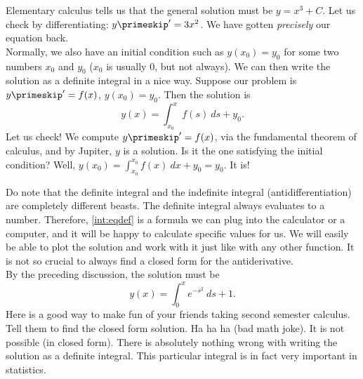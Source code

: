 {Elementary calculus tells us
that the general solution must be $y = x^3 + C$.  Let us check by
differentiating:
$y\primeskip ' = 3x^2$.  We have gotten \emph{precisely} our equation back.
}\\

Normally, we also have an initial condition such as $y(x_0) = y_0$
for some two numbers $x_0$ and $y_0$ ($x_0$ is usually 0, but not always).
We can then write the solution as a definite integral in a nice way.
Suppose our problem is $y\primeskip ' = f(x)$, $y(x_0) = y_0$.  Then the solution is
\begin{equation} \label{int:eqdef}
y(x) = \int_{x_0}^x f(s) ~ds + y_0 .
\end{equation}
Let us check!
We compute
$y\primeskip ' = f(x)$, via the fundamental theorem of calculus, and by Jupiter, $y$ is a
solution.  Is it the one satisfying the initial condition?  Well,
$y(x_0) = \int_{x_0}^{x_0} f(x)~dx + y_0 = y_0$.  It is!

Do note that the definite integral and the indefinite integral
(antidifferentiation) are completely different beasts.  The definite integral
always evaluates to a number.  Therefore, \eqref{int:eqdef} is a formula we
can plug into the calculator or a computer, and it will be happy to calculate
specific values for us.  We will easily be able to plot the
solution and work with it just like with any other function.
It is not so crucial to always find a
closed form for the antiderivative.\\

{By the preceding discussion, the solution must be
\begin{equation*}
y(x) = \int_0^x e^{-s^2} ~ds + 1 .
\end{equation*}
Here is a good way to make fun of your friends taking second semester
calculus.  Tell them to
find the closed form solution.  Ha ha ha (bad math joke).  It is
not possible (in closed form).
There is absolutely nothing wrong with writing the solution as a
definite integral.
This particular integral
is in fact very important
in statistics.
}\\


